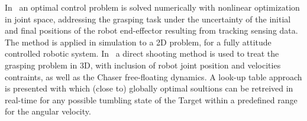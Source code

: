 In~\cite{flores2013optimal} an optimal control problem is solved numerically with nonlinear optimization in joint space, addressing the grasping task under the uncertainty of the initial and final positions of the robot end-effector resulting from tracking sensing data. %
The method is applied in simulation to a 2D problem, for a fully attitude controlled robotic system. In~\cite{lampariello2013generating} a direct shooting method is used to %
treat the grasping problem in 3D, with inclusion of robot joint position and velocities contraints, as well as the Chaser free-floating dynamics. A look-up table approach is presented with which (close to) globally optimal soultions can be retreived in real-time for any possible tumbling state of the Target within a predefined range for the angular velocity. 
%

